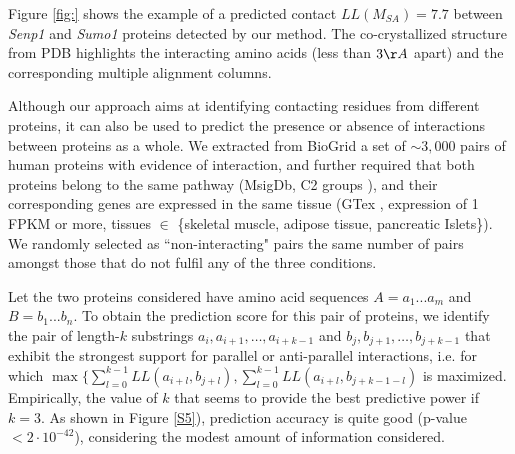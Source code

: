 
Figure \ref{fig:} shows the example of a predicted contact $LL(M_{SA}) = 7.7$ between \textit{Senp1} and \textit{Sumo1} proteins detected by our method. The co-crystallized structure from PDB highlights the interacting amino acids (less than $3 \AA$ apart) and the corresponding multiple alignment columns.

Although our approach aims at identifying contacting residues from different proteins, it can also be used to predict the presence or absence of interactions between proteins as a whole. We extracted from BioGrid \cite{stark2006biogrid} a set of $\sim3,000$ pairs of human proteins with evidence of interaction, and further required that both proteins belong to the same pathway (MsigDb, C2 groups \cite{subramanian2005gene}), and their corresponding genes are expressed in the same tissue (GTex \cite{lonsdale2013genotype}, expression of 1 FPKM or more, tissues $\in$ \{skeletal muscle, adipose tissue, pancreatic Islets\}). We randomly selected as ``non-interacting" pairs the same number of pairs amongst those that do not fulfil any of the three conditions.


Let the two proteins considered have amino acid sequences $A = a_1...a_m$ and $B = b_1...b_n$. To obtain the prediction score for this pair of proteins, we identify the pair of length-$k$ substrings $a_i, a_{i+1}, …, a_{i+k-1}$ and $b_j, b_{j+1}, …, b_{j+k-1}$ that exhibit the strongest support for parallel or anti-parallel interactions, i.e. for which $ \max \{ \sum_{l=0}^{k-1} LL(a_{i+l},b_{j+l}),  \sum_{l=0}^{k-1} LL(a_{i+l},b_{j+k-1-l})$ is maximized. Empirically, the value of $k$ that seems to provide the best predictive power if $k=3$. 
As shown in Figure \ref{S5}), prediction accuracy is quite good (p-value $< 2 \cdot 10^{-42}$), considering the modest amount of information considered.

